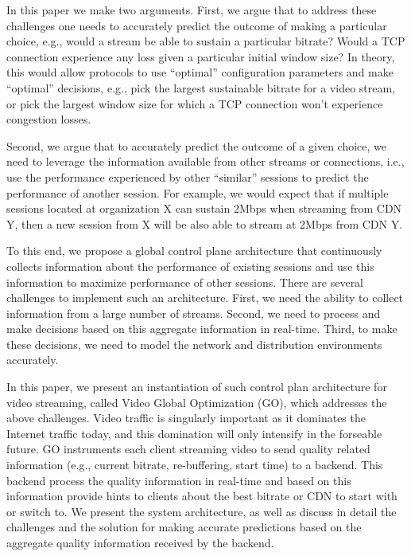 
In this paper we make two arguments. First, we argue that to address these challenges one needs to accurately predict the outcome of making a particular choice, e.g., would a stream be able to sustain a particular bitrate? Would a TCP connection experience any loss given a particular initial window size? In theory, this would allow protocols to use ``optimal'' configuration parameters and make ``optimal'' decisions, e.g., pick the largest sustainable bitrate for a video stream,  or pick the largest window size for which a TCP connection won't experience congestion losses. 

Second, we argue that to accurately predict the outcome of a given choice, we need to leverage the information available from other streams or connections, i.e., use the performance experienced by other ``similar'' sessions to predict the performance of another session. For example, we would expect that if multiple sessions located at organization X can sustain 2Mbps when streaming from CDN Y, then a new session from X will be also able to stream at 2Mbps from CDN Y. 

To this end, we propose a global control plane architecture that continuously collects information about the performance of existing sessions and use this information to maximize performance of other sessions. There are several challenges to implement such an architecture. First, we need the ability to collect information from a large number of streams. Second, we need to process and make decisions based on this aggregate information in real-time. Third, to make these decisions, we need to model the network and distribution environments accurately. 

In this paper, we present an instantiation of such control plan architecture for video streaming, called Video Global Optimization (GO), which addresses the above challenges.  Video traffic is singularly important as it dominates the Internet traffic today, and this domination will only intensify in the forseable future. GO instruments each client streaming video to send quality related information (e.g., current bitrate, re-buffering, start time) to a backend. This backend process the quality information in real-time and based on this information provide hints to clients about the best bitrate or CDN to start with or switch to. We present the system architecture, as well as discuss in detail the challenges and the solution for making accurate predictions based on the aggregate quality information received by the backend. 

